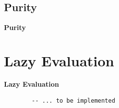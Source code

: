 \documentclass[unknownkeysallowed]{beamer}
\begin{document}

\subsection{Purity}
\begin{frame}

    \begin{center}
    \Large\textbf{Purity}
    \end{center}

\end{frame}

  
\section{Lazy Evaluation}
\begin{frame}

    \begin{center}
    \Large\textbf{Lazy Evaluation}
    \end{center}

\end{frame}


  \begin{frame}[fragile]

  \begin{verbatim}
        -- ... to be implemented
  \end{verbatim}
\end{frame}
  
\end{document}
